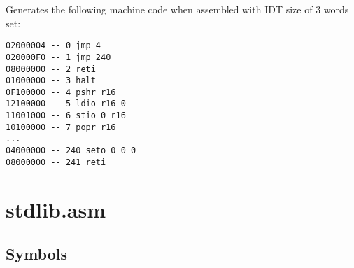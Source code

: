 \documentclass[12pt,twoside]{report}
\begin{document}
Generates the following machine code when assembled with IDT size of 3
words set:

\begin{verbatim}
02000004 -- 0 jmp 4
020000F0 -- 1 jmp 240
08000000 -- 2 reti
01000000 -- 3 halt
0F100000 -- 4 pshr r16
12100000 -- 5 ldio r16 0
11001000 -- 6 stio 0 r16
10100000 -- 7 popr r16
...
04000000 -- 240 seto 0 0 0
08000000 -- 241 reti
\end{verbatim}

\section{stdlib.asm}

\subsection{Symbols}
\end{document}
